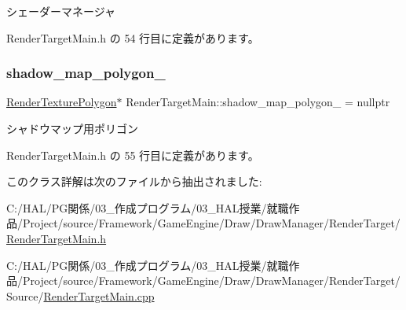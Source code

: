 シェーダーマネージャ 



 Render\+Target\+Main.\+h の 54 行目に定義があります。

\mbox{\label{class_render_target_main_a3c7da5871b3ed61bae36e05b5037c204}} 
\subsubsection{\texorpdfstring{shadow\+\_\+map\+\_\+polygon\+\_\+}{shadow\_map\_polygon\_}}
{\footnotesize\ttfamily \mbox{\hyperlink{class_render_texture_polygon}{Render\+Texture\+Polygon}}$\ast$ Render\+Target\+Main\+::shadow\+\_\+map\+\_\+polygon\+\_\+ = nullptr\hspace{0.3cm}{\ttfamily [private]}}



シャドウマップ用ポリゴン 



 Render\+Target\+Main.\+h の 55 行目に定義があります。



このクラス詳解は次のファイルから抽出されました\+:\begin{DoxyCompactItemize}
\item 
C\+:/\+H\+A\+L/\+P\+G関係/03\+\_\+作成プログラム/03\+\_\+\+H\+A\+L授業/就職作品/\+Project/source/\+Framework/\+Game\+Engine/\+Draw/\+Draw\+Manager/\+Render\+Target/\mbox{\hyperlink{_render_target_main_8h}{Render\+Target\+Main.\+h}}\item 
C\+:/\+H\+A\+L/\+P\+G関係/03\+\_\+作成プログラム/03\+\_\+\+H\+A\+L授業/就職作品/\+Project/source/\+Framework/\+Game\+Engine/\+Draw/\+Draw\+Manager/\+Render\+Target/\+Source/\mbox{\hyperlink{_render_target_main_8cpp}{Render\+Target\+Main.\+cpp}}\end{DoxyCompactItemize}
